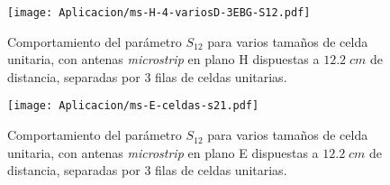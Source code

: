 \begin{figure}[h]
	\centering
	\texttt{[image: Aplicacion/ms-H-4-variosD-3EBG-S12.pdf]}
	\caption{Comportamiento del parámetro $S_{12}$ para varios tamaños de celda unitaria, con antenas \textit{microstrip} en plano H dispuestas a $12.2\; cm$ de distancia, separadas por 3 filas de celdas unitarias.}
	\label{fig:ms-H-4-variosD-3EBG-S12}
\end{figure}

\begin{figure}[h]
	\centering
	\texttt{[image: Aplicacion/ms-E-celdas-s21.pdf]}
	\caption{Comportamiento del parámetro $S_{12}$ para varios tamaños de celda unitaria, con antenas \textit{microstrip} en plano E dispuestas a $12.2\; cm$ de distancia, separadas por 3 filas de celdas unitarias.}
	\label{fig:ms-E-celdas-s21}
\end{figure}
